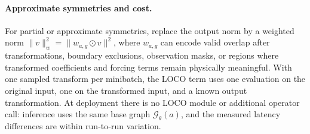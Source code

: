 \paragraph{Approximate symmetries and cost.} For partial or approximate symmetries, replace the output norm by a weighted norm \(\|v\|_w^2=\|w_{a,g}\odot v\|^2\), where \(w_{a,g}\) can encode valid overlap after transformations, boundary exclusions, observation masks, or regions where transformed coefficients and forcing terms remain physically meaningful. With one sampled transform per minibatch, the LOCO term uses one evaluation on the original input, one on the transformed input, and a known output transformation. At deployment there is no LOCO module or additional operator call: inference uses the same base graph \(\mathcal G_\theta(a)\), and the measured latency differences are within run-to-run variation.
